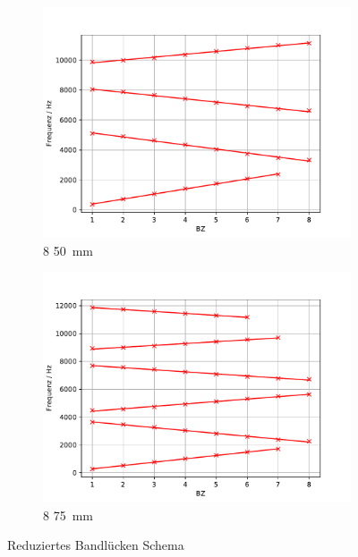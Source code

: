 \begin{figure}
 \centering
 \begin{subfigure}{0.48\textwidth}
  \centering
  \includegraphics[width=1\textwidth]{RedBandSchem.pdf}
  \caption{8 \cdot \SI{50}{mm}}
  \label{fig.RedBandSchem}
 \end{subfigure}
 \begin{subfigure}{0.48\textwidth}
  \centering
  \includegraphics[width=1\textwidth]{RedBandSchem75.pdf}
  \caption{8 \cdot \SI{75}{mm}}
  \label{fig.RedBandSchem75}
 \end{subfigure}
 \caption{Reduziertes Bandlücken Schema}
\end{figure}



